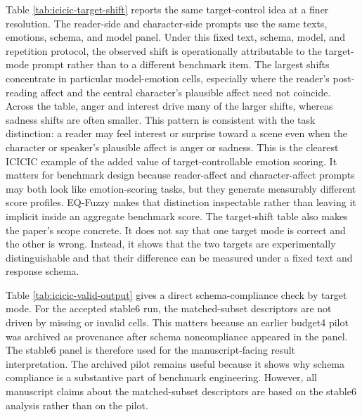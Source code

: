 \documentclass[12pt,a4paper]{icicel}
\begin{document}
\begin{table}[t]
\centering
\footnotesize
\caption{Model-level EQ-Fuzzy descriptors generated from the stable6 matched subset.}
\label{tab:icicic-model-descriptors}
{\tiny\setlength{\tabcolsep}{1pt}}
\end{table}

Table \ref{tab:icicic-target-shift} reports the same target-control idea at a
finer resolution.
The reader-side and character-side prompts use the same texts, emotions, schema,
and model panel.
Under this fixed text, schema, model, and repetition protocol, the observed
shift is operationally attributable to the target-mode prompt rather than to a
different benchmark item.
The largest shifts concentrate in particular model-emotion cells, especially
where the reader's post-reading affect and the central character's plausible
affect need not coincide.
Across the table, anger and interest drive many of the larger shifts, whereas
sadness shifts are often smaller.
This pattern is consistent with the task distinction: a reader may feel
interest or surprise toward a scene even when the character or speaker's
plausible affect is anger or sadness.
This is the clearest ICICIC example of the added value of target-controllable
emotion scoring.
It matters for benchmark design because reader-affect and character-affect
prompts may both look like emotion-scoring tasks, but they generate measurably
different score profiles.
EQ-Fuzzy makes that distinction inspectable rather than leaving it implicit
inside an aggregate benchmark score.
The target-shift table also makes the paper's scope concrete.
It does not say that one target mode is correct and the other is wrong.
Instead, it shows that the two targets are experimentally distinguishable and
that their difference can be measured under a fixed text and response schema.

\begin{table}[t]
\centering
\footnotesize
\caption{Target-shift summary by model and emotion generated from the stable6 matched subset.}
\label{tab:icicic-target-shift}
{\tiny\setlength{\tabcolsep}{2pt}}
\end{table}

Table \ref{tab:icicic-valid-output} gives a direct schema-compliance check by
target mode.
For the accepted stable6 run, the matched-subset descriptors are not driven by
missing or invalid cells.
This matters because an earlier budget4 pilot was archived as provenance after
schema noncompliance appeared in the panel.
The stable6 panel is therefore used for the manuscript-facing result
interpretation.
The archived pilot remains useful because it shows why schema compliance is a
substantive part of benchmark engineering.
However, all manuscript claims about the matched-subset descriptors are based
on the stable6 analysis rather than on the pilot.
\end{document}

